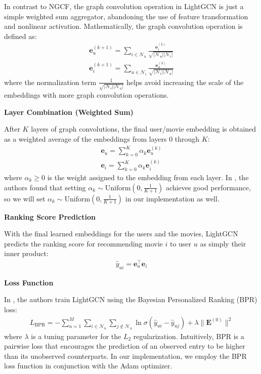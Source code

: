\documentclass{article}
\begin{document}
In contrast to NGCF, the graph convolution operation in LightGCN is just a simple weighted sum aggregator, abandoning the use of feature transformation and nonlinear activation. Mathematically, the graph convolution operation is defined as:
\begin{align*}
    \mathbf{e}_u^{(k+1)} = \sum_{i \in \mathcal{N}_u} \frac{\mathbf{e}_i^{(k)}}{\sqrt{| \mathcal{N}_u | | \mathcal{N}_i | }} \\
    \mathbf{e}_i^{(k+1)} = \sum_{u \in \mathcal{N}_i} \frac{\mathbf{e}_u^{(k)}}{\sqrt{| \mathcal{N}_i | | \mathcal{N}_u | }}
\end{align*}
where the normalization term $\frac{1}{\sqrt{|\mathcal{N}_i| |\mathcal{N}_u|}}$ helps avoid increasing the scale of the embeddings with more graph convolution operations. \cite{lightgcn}

\textbf{Layer Combination (Weighted Sum)}

After $K$ layers of graph convolutions, the final user/movie embedding is obtained as a weighted average of the embeddings from layers $0$ through $K$:
\begin{align*}
    \mathbf{e}_u = \sum_{k = 0}^K \alpha_k \mathbf{e}_u^{(k)} \\
    \mathbf{e}_i = \sum_{k = 0}^K \alpha_k \mathbf{e}_i^{(k)}
\end{align*}
where $\alpha_k \geq 0$ is the weight assigned to the embedding from each layer. In \cite{lightgcn}, the authors found that setting $\alpha_k \sim \mbox{Uniform}(0, \frac{1}{K + 1})$ achieves good performance, so we will set $\alpha_k \sim \mbox{Uniform}(0, \frac{1}{K+1})$ in our implementation as well.

\textbf{Ranking Score Prediction}

With the final learned embeddings for the users and the movies, LightGCN predicts the ranking score \cite{lightgcn} for recommending movie $i$ to user $u$ as simply their inner product:
\begin{align*}
    \hat{y}_{ui} = \mathbf{e}_u^\top \mathbf{e}_i
\end{align*}

\textbf{Loss Function}

In \cite{lightgcn}, the authors train LightGCN using the Bayesian Personalized Ranking (BPR) loss:
\begin{align*}
    L_{\mbox{BPR}} = - \sum_{u = 1}^M \sum_{i \in \mathcal{N}_u} \sum_{j \notin \mathcal{N}_u} \ln \sigma(\hat{y}_{ui} - \hat{y}_{uj}) + \lambda \| \mathbf{E}^{(0)} \|^2
\end{align*}
where $\lambda$ is a tuning parameter for the $L_2$ regularization. Intuitively, BPR is a pairwise loss that encourages the prediction of an observed entry to be higher than its unobserved counterparts. In our implementation, we employ the BPR loss function in conjunction with the Adam \cite{adam} optimizer.
\end{document}
